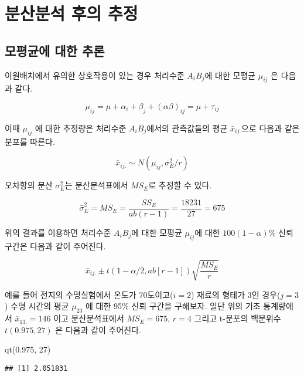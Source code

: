 \documentclass[
]{book}
\newenvironment{Shaded}{\begin{snugshade}}{\end{snugshade}}
\newcommand{\DecValTok}[1]{\textcolor[rgb]{0.00,0.00,0.81}{#1}}
\newcommand{\FloatTok}[1]{\textcolor[rgb]{0.00,0.00,0.81}{#1}}
\newcommand{\FunctionTok}[1]{\textcolor[rgb]{0.00,0.00,0.00}{#1}}
\newcommand{\NormalTok}[1]{#1}
\begin{document}
\hypertarget{uxbd84uxc0b0uxbd84uxc11d-uxd6c4uxc758-uxcd94uxc815}{%
\section{분산분석 후의 추정}\label{uxbd84uxc0b0uxbd84uxc11d-uxd6c4uxc758-uxcd94uxc815}}

\hypertarget{uxbaa8uxd3c9uxade0uxc5d0-uxb300uxd55c-uxcd94uxb860}{%
\subsection{모평균에 대한 추론}\label{uxbaa8uxd3c9uxade0uxc5d0-uxb300uxd55c-uxcd94uxb860}}

이원배치에서 유의한 상호작용이 있는 경우 처리수준 \(A_iB_j\)에 대한 모평균 \(\mu_{ij}\) 은 다음과 같다.

\[ \mu_{ij} = \mu + \alpha_i + \beta_j + (\alpha \beta)_{ij} = \mu + \tau_{ij} \]

이때 \(\mu_{ij}\) 에 대한 추정량은 처리수준 \(A_iB_j\)에서의 관측값들의 평균 \(\bar {x}_{ij.}\)으로 다음과 같은 분포를 따른다.

\[ \bar {x}_{ij.} \sim N(\mu_{ij}, \sigma^2_E/ r) \]

오차항의 분산 \(\sigma^2_E\)는 분산분석표에서 \(MS_E\)로 추정할 수 있다.

\[ \hat \sigma^2_E = MS_E = \frac{SS_E}{ab(r-1)} =\frac{18231}{27} = 675 \]

위의 결과를 이용하면 처리수준 \(A_iB_j\)에 대한 모평균 \(\mu_{ij}\)에 대한 \(100(1-\alpha)\)\% 신뢰구간은 다음과 같이 주어진다.

\[ \bar x_{ij.} \pm t(1-\alpha/2, ab[r-1]) \sqrt{ \frac{MS_E}{r}}  \]

예를 들어 전지의 수명실험에서 온도가 70도이고(\(i=2\)) 재료의 형테가 3인 경우(\(j=3\)) 수명 시간의 평균 \(\mu_{23}\) 에 대한 95\% 신뢰 구간을 구해보자. 일단 위의 기초 통계량에서 \(\bar x_{13.}=146\) 이고 분산분석표에서 \(MS_E =675\), \(r=4\) 그리고 t-분포의 백분위수 \(t(0.975, 27)\) 은 다음과 같이 주어진다.

\begin{Shaded}
\begin{Highlighting}[]
\FunctionTok{qt}\NormalTok{(}\FloatTok{0.975}\NormalTok{, }\DecValTok{27}\NormalTok{)}
\end{Highlighting}
\end{Shaded}

\begin{verbatim}
## [1] 2.051831
\end{verbatim}
\end{document}
